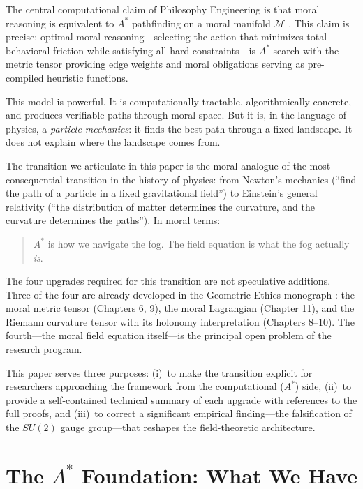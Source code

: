 \documentclass[12pt]{article}
\theoremstyle{definition}
\theoremstyle{remark}
\newcommand{\M}{\mathcal{M}}
\begin{document}
The central computational claim of Philosophy Engineering is that moral reasoning is equivalent to $A^*$ pathfinding on a moral manifold $\M$ \citep{anonymous2026pe}. This claim is precise: optimal moral reasoning---selecting the action that minimizes total behavioral friction while satisfying all hard constraints---is $A^*$ search with the metric tensor providing edge weights and moral obligations serving as pre-compiled heuristic functions.

This model is powerful. It is computationally tractable, algorithmically concrete, and produces verifiable paths through moral space. But it is, in the language of physics, a \emph{particle mechanics}: it finds the best path through a fixed landscape. It does not explain where the landscape comes from.

The transition we articulate in this paper is the moral analogue of the most consequential transition in the history of physics: from Newton's mechanics (``find the path of a particle in a fixed gravitational field'') to Einstein's general relativity (``the distribution of matter determines the curvature, and the curvature determines the paths''). In moral terms:

\begin{quote}
$A^*$ is how we navigate the fog. The field equation is what the fog actually \emph{is}.
\end{quote}

The four upgrades required for this transition are not speculative additions. Three of the four are already developed in the Geometric Ethics monograph \citep{anonymous2026ge}: the moral metric tensor (Chapters 6, 9), the moral Lagrangian (Chapter 11), and the Riemann curvature tensor with its holonomy interpretation (Chapters 8--10). The fourth---the moral field equation itself---is the principal open problem of the research program.

This paper serves three purposes: (i)~to make the transition explicit for researchers approaching the framework from the computational ($A^*$) side, (ii)~to provide a self-contained technical summary of each upgrade with references to the full proofs, and (iii)~to correct a significant empirical finding---the falsification of the $SU(2)$ gauge group---that reshapes the field-theoretic architecture.


\section{The $A^*$ Foundation: What We Have}
\label{sec:astar}
\end{document}
